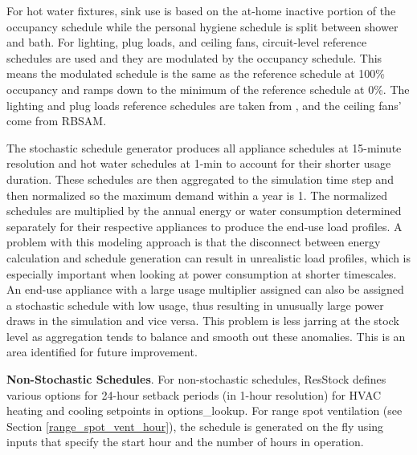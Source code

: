 For hot water fixtures, sink use is based on the at-home inactive portion of the occupancy schedule while the personal hygiene schedule is split between shower and bath. For lighting, plug loads, and ceiling fans, circuit-level reference schedules are used and they are modulated by the occupancy schedule. This means the modulated schedule is the same as the reference schedule at 100\% occupancy and ramps down to the minimum of the reference schedule at 0\%. The lighting and plug loads reference schedules are taken from \citet{Wilson2014}, and the ceiling fans' come from RBSAM.  

The stochastic schedule generator produces all appliance schedules at 15-minute resolution and hot water schedules at 1-min to account for their shorter usage duration. These schedules are then aggregated to the simulation time step and then normalized so the maximum demand within a year is 1. The normalized schedules are multiplied by the annual energy or water consumption determined separately for their respective appliances to produce the end-use load profiles. A problem with this modeling approach is that the disconnect between energy calculation and schedule generation can result in unrealistic load profiles, which is especially important when looking at power consumption at shorter timescales. An end-use appliance with a large usage multiplier assigned can also be assigned a stochastic schedule with low usage, thus resulting in unusually large power draws in the simulation and vice versa. This problem is less jarring at the stock level as aggregation tends to balance and smooth out these anomalies. This is an area identified for future improvement.


\textbf{Non-Stochastic Schedules}. For non-stochastic schedules, ResStock defines various options for 24-hour setback periods (in 1-hour resolution) for HVAC heating and cooling setpoints in options\_lookup. For range spot ventilation (see Section  \ref{range_spot_vent_hour}), the schedule is generated on the fly using inputs that specify the start hour and the number of hours in operation.

